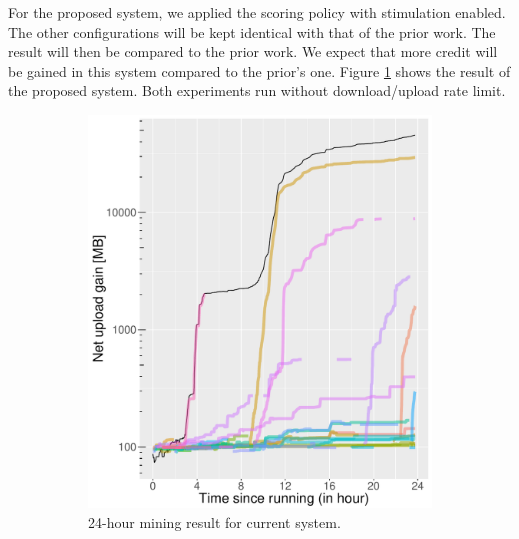 For the proposed system, we applied the scoring policy with stimulation enabled. The other configurations will be kept identical with that of the prior work. The result will then be compared to the prior work. We expect that more credit will be gained in this system compared to the prior's one. Figure \ref{fig:newetree24} shows the result of the proposed system. Both experiments run without download/upload rate limit.


\begin{figure}[h]
	\begin{adjustwidth}{-1.5cm}{}
		\begin{subfigure}[t]{0.6\textwidth}
			\centering
			\includegraphics[width=\textwidth]{pics/results/b136.pdf}
			\caption{24-hour mining result for current system.}
			\label{fig:newetree24}
		\end{subfigure}
		~
		\begin{subfigure}[t]{0.6\textwidth}
			\centering

\end{subfigure}
\end{adjustwidth}
\end{figure}
